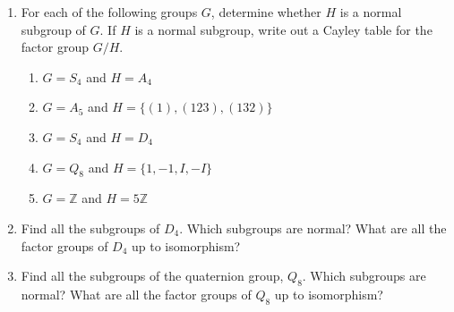 {\small
 
 
\begin{enumerate}
 
 
\bf\item\rm
For each of the following groups $G$, determine whether $H$ is a normal
subgroup of $G$. If $H$ is a normal subgroup, write out a Cayley table
for the factor group $G/H$.
\begin{enumerate}
 
 \bf\item\rm
$G = S_4$ and $H = A_4$

 \bf\item\rm
$G = A_5$ and $H = \{ (1), (123), (132) \}$
 
 \bf\item\rm
$G = S_4$ and $H = D_4$
 
 \bf\item\rm
$G = Q_8$ and $H = \{ 1, -1, I, -I \}$
 
 \bf\item\rm
$G = {\mathbb Z}$ and $H = 5 {\mathbb Z}$
 
\end{enumerate}

 
 
\bf\item\rm
Find all the subgroups of $D_4$. Which subgroups are normal? What are
all the factor groups of $D_4$ up to isomorphism?
 
 
\bf\item\rm
Find all the subgroups of the quaternion group, $Q_8$. Which subgroups
are normal? What are all the factor groups of $Q_8$ up to isomorphism?
 
 
% 
 

\end{enumerate}}
